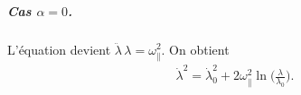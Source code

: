 \subparagraph{Cas \(\alpha=0\).}
L'équation devient \(\ddot\lambda\,\lambda=\omega_\parallel^2\). On obtient
\begin{eqnarray}
\dot\lambda^2 = \dot\lambda_0^2 + 2\omega_\parallel^2\ln\!\big(\tfrac{\lambda}{\lambda_0}\big).
\end{eqnarray}







